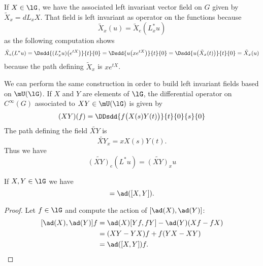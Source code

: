If $X\in\lG$, we have the associated left invariant vector field on $G$ given by $\tilde X_x=dL_xX$. That field is left invariant as operator on the functions because
\begin{equation}
	\tilde X_x(u)=\tilde X_e(L^*_xu)
\end{equation}
as the following computation shows
\begin{equation}
	\tilde X_e(L^*u)=\Dsdd{ (L_x^*u)\big(  e^{tX} \big) }{t}{0}
	=\Dsdd{ u\big( x e^{tX} \big) }{t}{0}
	=\Dsdd{ u\big( \tilde X_x(t) \big) }{t}{0}
	=\tilde X_x(u)
\end{equation}
because the path defining $\tilde X_x$ is $x e^{tX}$.

We can perform the same construction in order to build left invariant fields based on $\mU(\lG)$. If $X$ and $Y$ are elements of $\lG$, the  differential operator on $ C^{\infty}(G)$ associated to $XY\in\mU(\lG)$ is given by
\begin{equation}
	(XY)(f)=\DDsdd{ f\big( X(s)Y(t) \big) }{t}{0}{s}{0}
\end{equation}
The path defining the field $\widetilde{XY}$ is
\begin{equation}
	\widetilde{XY}_x=xX(s)Y(t).
\end{equation}
Thus we have
\begin{equation}        \label{EqInvarUgField}
	\widetilde{(XY)}_e(L^*u)=\widetilde{(XY)}_xu
\end{equation}

\begin{lemma}       \label{LemAdesthioo}
	If \( X,Y\in\lG\) we have
	\begin{equation}
		[\ad(X),\ad(Y)]=\ad([X,Y]).
	\end{equation}
\end{lemma}

\begin{proof}
	Let \( f\in\lG\) and compute the action of \( [\ad(X),\ad(Y)]\):
	\begin{subequations}
		\begin{align}
			[\ad(X),\ad(Y)]f & =\ad(X)[Yf,fY]-\ad(Y)(Xf-fX) \\
			                 & =(XY-YX)f+f(YX-XY)           \\
			                 & =\ad([X,Y])f.
		\end{align}
	\end{subequations}
\end{proof}

